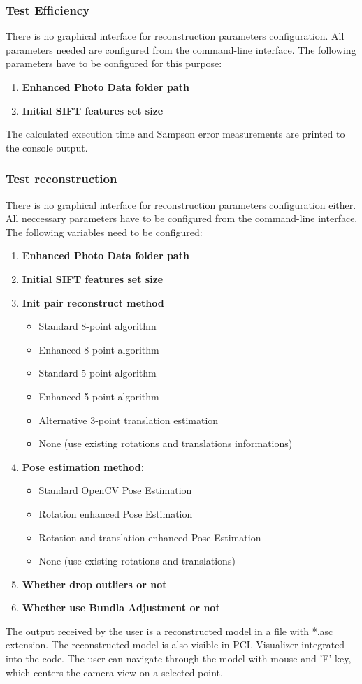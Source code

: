 \subsubsection{Test Efficiency}
There is no graphical interface for reconstruction parameters configuration. All parameters needed are configured from the command-line interface. The following parameters have to be configured for this purpose:
\begin{enumerate}
\item \textbf{Enhanced Photo Data folder path}
\item \textbf{Initial SIFT features set size}
\end{enumerate}
The calculated execution time and Sampson error measurements are printed to the console output.
\subsubsection{Test reconstruction}
There is no graphical interface for reconstruction parameters configuration either. All neccessary parameters have to be configured from the command-line interface. The following variables need to be configured:
\begin{enumerate}
\item \textbf{Enhanced Photo Data folder path}
\item \textbf{Initial SIFT features set size}
\item \textbf{Init pair reconstruct method}
\begin{itemize}
\item Standard 8-point algorithm
\item Enhanced 8-point algorithm
\item Standard 5-point algorithm
\item Enhanced 5-point algorithm
\item Alternative 3-point translation estimation
\item None (use existing rotations and translations informations)
\end{itemize}
\item \textbf{Pose estimation method:}
\begin{itemize}
\item Standard OpenCV Pose Estimation
\item Rotation enhanced Pose Estimation 
\item Rotation and translation enhanced Pose Estimation
\item None (use existing rotations and translations)
\end{itemize}
\item \textbf{Whether drop outliers or not}
\item \textbf{Whether use Bundla Adjustment or not}
\end{enumerate}
The output received by the user is a reconstructed model in a file with *.asc extension. The reconstructed model is also visible in PCL Visualizer integrated into the code. The user can navigate through the model with mouse and 'F' key, which centers the camera view on a selected point.
